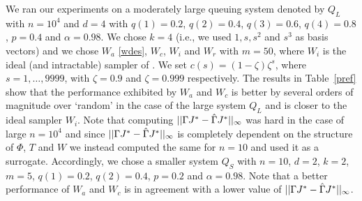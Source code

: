 We ran our experiments on a moderately large queuing system denoted by $Q_L$ with $n=10^4$ and $d=4$ with $q(1)=0.2$, $q(2)=0.4$, $q(3)=0.6$, $q(4)=0.8$, $p=0.4$ and $\alpha=0.98$. We chose $k=4$ (i.e., we used $1, s,s^2$ and $s^3$ as basis vectors) and we chose $W_a$ \eqref{wdes}, $W_c$, $W_i$ and $W_r$ with $m=50$, where $W_i$ is the ideal 
(and intractable) sampler of \citep{CS}.
We set $c(s)=(1-\zeta) \zeta^s$, where $s=1,\ldots,9999$, with $\zeta=0.9$ and $\zeta=0.999$ respectively. The results in Table~\ref{pref} show that the performance exhibited by $W_a$ and $W_c$ is better by several orders of magnitude over `random' in the case of the large system $Q_L$ and is closer to the ideal sampler $W_i$. Note that computing $||\Gamma J^*-\hat{\Gamma} J^*||_\infty$ was hard in the case of large $n=10^4$ and since $||\Gamma J^*-\hat{\Gamma} J^*||_\infty$ is completely dependent on the structure of $\Phi$, $T$ and $W$ we instead computed the same for $n=10$ and used it as a surrogate. Accordingly, we chose a smaller system $Q_S$ with $n=10$, $d=2$, $k=2$, $m=5$, $q(1)=0.2$, $q(2)=0.4$, $p=0.2$ and $\alpha=0.98$. Note that a better performance of $W_a$ and $W_c$ is in agreement with a lower value of $||\Gamma J^*-\hat{\Gamma} J^*||_\infty$.
\FloatBarrier
\begin{table}[H]
\begin{center}
\end{center}
\caption{Shows values of Error Terms for $Q_L$.}
\label{pref}
\end{table}
